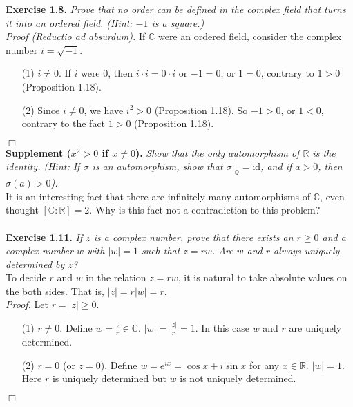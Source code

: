 \documentclass{article}
\begin{document}



\textbf{Exercise 1.8.}
\emph{Prove that no order can be defined in the complex field that turns it
into an ordered field.
(Hint: $-1$ is a square.)} \\

\emph{Proof (Reductio ad absurdum).}
If $\mathbb{C}$ were an ordered field, consider the complex number $i = \sqrt{-1}$.

\begin{enumerate}
\item[(1)]
$i \neq 0$.
If $i$ were $0$, then $i \cdot i = 0 \cdot i$ or $-1 = 0$,
or $1 = 0$, contrary to $1 > 0$ (Proposition 1.18).
\item[(2)]
Since $i \neq 0$, we have $i^2 > 0$ (Proposition 1.18).
So $-1 > 0$, or $1 < 0$, contrary to the fact $1 > 0$ (Proposition 1.18).
\end{enumerate}
$\Box$ \\

\textbf{Supplement ($x^2 > 0$ if $x \neq 0$).}
\emph{Show that the only automorphism of $\mathbb{R}$ is the identity.
(Hint: If $\sigma$ is an automorphism, show that $\sigma|_{\mathbb{Q}} = \text{id}$,
and if $a > 0$, then $\sigma(a) > 0$).} \\

It is an interesting fact that there are infinitely many automorphisms of $\mathbb{C}$,
even thought $[\mathbb{C}:\mathbb{R}] = 2$.
Why is this fact not a contradiction to this problem? \\\\






\textbf{Exercise 1.11.}
\emph{If $z$ is a complex number, prove that there exists an $r \geq 0$
and a complex number $w$ with $|w| = 1$ such that $z = rw$.
Are $w$ and $r$ always uniquely determined by $z$?} \\

To decide $r$ and $w$ in the relation $z = rw$, it is natural to take
absolute values on the both sides. That is, $|z| = r|w| = r$. \\

\emph{Proof.}
Let $r = |z| \geq 0$.
\begin{enumerate}
\item[(1)]
$r \neq 0$.
Define $w = \frac{z}{r} \in \mathbb{C}$. $|w| = \frac{|z|}{r} = 1$.
In this case $w$ and $r$ are uniquely determined.
\item[(2)]
$r = 0$ (or $z = 0$).
Define $w = e^{ix} = \cos x + i \sin x$ for any $x \in \mathbb{R}$.
$|w| = 1$.
Here $r$ is uniquely determined
but $w$ is not uniquely determined.
\end{enumerate}
$\Box$ \\\\
\end{document}
